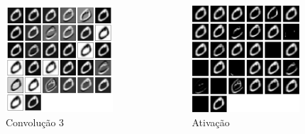 \documentclass[tikz,10pt]{beamer}
\begin{document}
\begin{frame}
\begin{columns}
		\begin{column}{0.33\textwidth}
			\begin{figure}
				\includegraphics[height=4cm]{images/resultados/network_1/input_1_layer_convolution2d_3}%
				\caption{Convolução 3}
			\end{figure}%
		\end{column}
		\begin{column}{0.33\textwidth}
			\begin{figure}
				\includegraphics[height=4cm]{images/resultados/network_1/input_1_layer_activation_3}%
				\caption{Ativação}			
			\end{figure}%
		\end{column}	
	\end{columns}
	
\end{frame}
\end{document}
